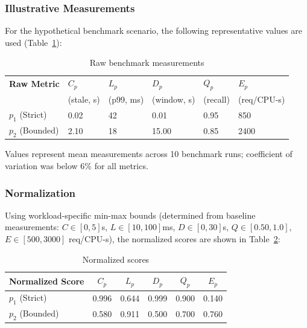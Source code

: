 \documentclass[conference]{IEEEtran}
\begin{document}
\subsubsection{Illustrative Measurements}
For the hypothetical benchmark scenario, the following representative values are used (Table~\ref{tab:raw-benchmark}):

\begin{table}[t]
\caption{Raw benchmark measurements}
\label{tab:raw-benchmark}
\centering
\small
\renewcommand{\arraystretch}{1.1}

\begin{tabularx}{\columnwidth}{@{}lXXXXX@{}}
\toprule
\textbf{Raw Metric} &
\textbf{$C_p$} &
\textbf{$L_p$} &
\textbf{$D_p$} &
\textbf{$Q_p$} &
\textbf{$E_p$} \\
&
(stale, s) &
(p99, ms) &
(window, s) &
(recall) &
(req/CPU-s) \\
\midrule
$p_1$ (Strict)  & 0.02 & 42 & 0.01 & 0.95 & 850 \\
$p_2$ (Bounded) & 2.10 & 18 & 15.00 & 0.85 & 2400 \\
\bottomrule
\end{tabularx}
\end{table}

\noindent\small Values represent mean measurements across 10 benchmark runs; coefficient of variation was below 6\% for all metrics.

\subsubsection{Normalization}
Using workload-specific min-max bounds (determined from baseline measurements: $C \in [0, 5]$s, $L \in [10, 100]$ms, $D \in [0, 30]$s, $Q \in [0.50, 1.0]$, $E \in [500, 3000]$ req/CPU-s), the normalized scores are shown in Table~\ref{tab:normalized-scores}:

\begin{table}[t]
\caption{Normalized scores}
\label{tab:normalized-scores}
\centering
\small
\begin{tabular}{@{}l c c c c c@{}}
\toprule
Normalized Score & $C_p$ & $L_p$ & $D_p$ & $Q_p$ & $E_p$ \\
\midrule
$p_1$ (Strict) & 0.996 & 0.644 & 0.999 & 0.900 & 0.140 \\
$p_2$ (Bounded) & 0.580 & 0.911 & 0.500 & 0.700 & 0.760 \\
\bottomrule
\end{tabular}
\end{table}
\end{document}
